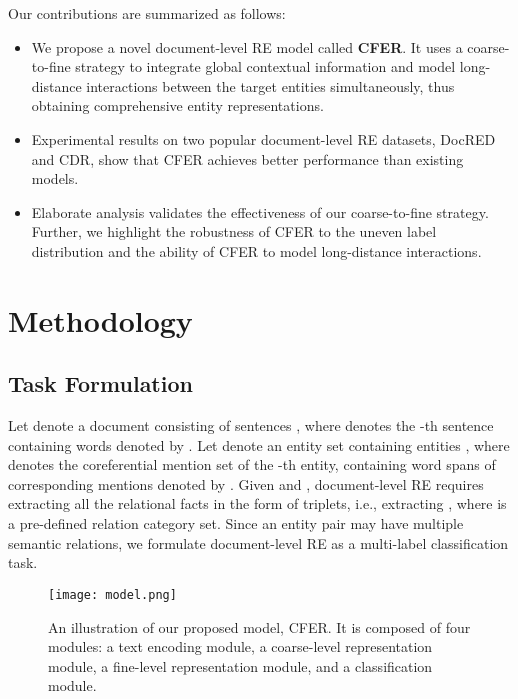 \documentclass{article}
\begin{document}
Our contributions are summarized as follows: 
\begin{itemize}
    \item 
    We propose a novel document-level RE model called \textbf{CFER}. 
    It uses a coarse-to-fine strategy to integrate global contextual information and model long-distance interactions between the target entities simultaneously, thus obtaining comprehensive entity representations. 
    
    \item 
    Experimental results on two popular document-level RE datasets, DocRED and CDR, show that CFER achieves better performance than existing models. 
    
    \item 
    Elaborate analysis validates the effectiveness of our coarse-to-fine strategy. 
    Further, we highlight the robustness of CFER to the uneven label distribution and the ability of CFER to model long-distance interactions. 
\end{itemize}

\section{Methodology}

\subsection{Task Formulation}

Let  denote a document consisting of  sentences , 
where  denotes the -th sentence containing  words denoted by . 
Let  denote an entity set containing  entities , where  denotes the coreferential mention set of the -th entity, containing  word spans of corresponding mentions denoted by . 
Given  and , document-level RE requires extracting all the relational facts in the form of triplets, i.e., extracting , where  is a pre-defined relation category set. 
Since an entity pair may have multiple semantic relations, we formulate document-level RE as a multi-label classification task. 

\begin{figure*}[t]
\centering
\texttt{[image: model.png]}
\caption{
An illustration of our proposed model, CFER. 
It is composed of four modules: a text encoding module, a coarse-level representation module, a fine-level representation module, and a classification module. 
}
\label{fig:model}
\end{figure*}
\end{document}
